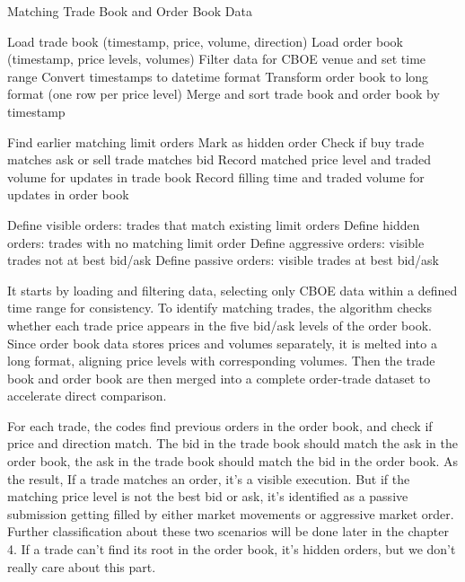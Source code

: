 \begin{algorithm}
    \caption{Matching Trade Book and Order Book Data}
    \label{alg:trade_order_matching}
    \begin{algorithmic}[1]
        \State Load trade book (timestamp, price, volume, direction)
        \State Load order book (timestamp, price levels, volumes)
        \State Filter data for CBOE venue and set time range
        \State Convert timestamps to datetime format
        \State Transform order book to long format (one row per price level)
        \State Merge and sort trade book and order book by timestamp
    
            \State Find earlier matching limit orders
                \State Mark as hidden order
            \Else
                \State Check if buy trade matches ask or sell trade matches bid
                \State Record matched price level and traded volume for updates in trade book
                \State Record filling time and traded volume for updates in order book
            \EndIf
        \EndFor
    
        \State Define visible orders: trades that match existing limit orders
        \State Define hidden orders: trades with no matching limit order
        \State Define aggressive orders: visible trades not at best bid/ask
        \State Define passive orders: visible trades at best bid/ask
    
    \end{algorithmic}
\end{algorithm}

It starts by loading and filtering data, selecting only CBOE data within a defined time range for consistency. To identify matching trades, the algorithm checks whether each trade price appears in the five bid/ask levels of the order book. Since order book data stores prices and volumes separately, it is melted into a long format, aligning price levels with corresponding volumes. Then the trade book and order book are then merged into a complete order-trade dataset to accelerate direct comparison.

For each trade, the codes find previous orders in the order book, and check if price and direction match. The bid in the trade book should match the ask in the order book, the ask in the trade book should match the bid in the order book. As the result, If a trade matches an order, it's a visible execution. But if the matching price level is not the best bid or ask, it's identified as a passive submission getting filled by either market movements or aggressive market order. Further classification about these two scenarios will be done later in the chapter 4. If a trade can't find its root in the order book, it's hidden orders, but we don't really care about this part.

